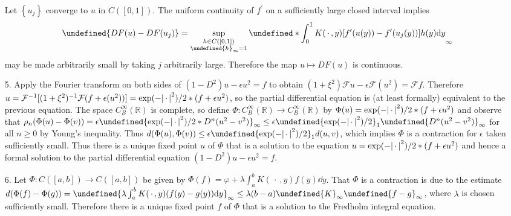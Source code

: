 \documentclass[11pt,leqno]{article}
\theoremstyle{plain}
\theoremstyle{definition}
\numberwithin{equation}{section}
\numberwithin{lem}{section}
\newcommand{\cbr}[1]{\left\{#1\right\}}
\let\norm\undefined %
\DeclarePairedDelimiter\norm{\lVert}{\rVert}
\begin{document}
\begin{enumerate}
    Let $\cbr{u_j}$ converge to $u$ in $C([0,1])$. The uniform continuity of $f^\prime$ on a sufficiently large closed interval implies
    \[\norm{DF(u)-DF(u_j)} = \sup_{\substack{h\in C([0,1])\\ \norm{h}_\infty = 1}}\norm*{\int_0^1K(\,\cdot\, ,y)[f^\prime(u(y))- f^\prime(u_j(y))]h(y)\dd y}_\infty\] may be made arbitrarily small by taking $j$ arbitrarily large. Therefore the map $u\mapsto DF(u)$ is continuous.
    \item[5.] Apply the Fourier transform on both sides of $(1-D^2)u - \epsilon u^2 = f$ to obtain $(1+\xi^2)\mathcal F u - \epsilon \mathcal F(u^2) = \mathcal F f$. Therefore $u = \mathcal F^{-1}[(1+\xi^2)^{-1}\mathcal F(f+\epsilon (u^2))] = \exp\relax(-\abs{\,\cdot\,}^2)/2\ast (f+\epsilon u^2)$, so the partial differential equation is (at least formally) equivalent to the previous equation. The space $C^\infty_B(\mathbb R)$ is complete, so define $\Phi\colon C^\infty_B(\mathbb R)\to C^\infty_B(\mathbb R)$ by $\Phi(u) = \exp\relax(-\abs{\,\cdot\,}^2)/2\ast (f+\epsilon u^2)$ and observe that $\rho_n(\Phi(u)-\Phi(v)) = \epsilon\norm{\exp\relax(-\abs{\,\cdot\,}^2)/2\ast D^n(u^2-v^2)}_\infty \leq \epsilon\norm{\exp\relax(-\abs{\,\cdot\,}^2)/2}_1\norm{D^n(u^2-v^2)}_\infty$ for all $n\geq 0$ by Young's inequality. Thus $d(\Phi(u),\Phi(v))\leq \epsilon\norm{\exp\relax(-\abs{\,\cdot\,}^2)/2}_1d(u,v)$, which implies $\Phi$ is a contraction for $\epsilon$ taken sufficiently small. Thus there is a unique fixed point $u$ of $\Phi$ that is a solution to the equation $u = \exp\relax(-\abs{\,\cdot\,}^2)/2\ast (f+\epsilon u^2)$ and hence a formal solution to the partial differential equation $(1-D^2)u - \epsilon u^2 = f$.
    \item[6.] Let $\Phi\colon C([a,b])\to C([a,b])$ be given by $\Phi(f) = \varphi + \lambda\int_a^b K(\,\cdot\,,y)f(y)\dd y$. That $\Phi$ is a contraction is due to the estimate $d(\Phi(f)-\Phi(g)) = \norm{\lambda\int_a^bK(\,\cdot\,,y)(f(y)-g(y))\dd y}_\infty\leq \lambda(b-a)\norm{K}_\infty\norm{f-g}_\infty$, where $\lambda$ is chosen sufficiently small. Therefore there is a unique fixed point $f$ of $\Phi$ that is a solution to the Fredholm integral equation.
\end{enumerate}
\end{document}
